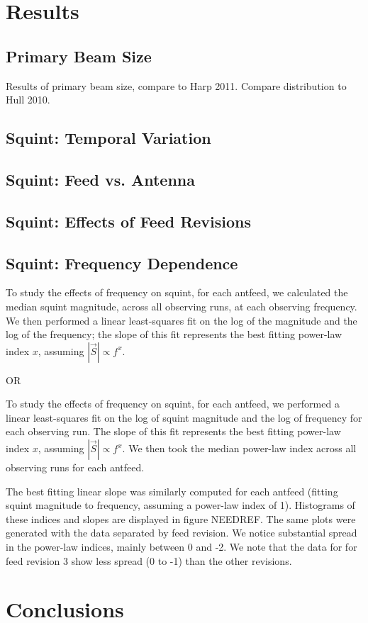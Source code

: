 \documentclass[preprint]{aastex}
\begin{document}
\section{Results}\label{s.results}

\subsection{Primary Beam Size}\label{ss.beamsize}
Results of primary beam size, compare to Harp 2011\cite{Harp2011}.
Compare distribution to Hull 2010\cite{Hull2010}.

\subsection{Squint: Temporal Variation}\label{ss.temporal}

\subsection{Squint: Feed vs. Antenna}\label{ss.antfeed}

\subsection{Squint: Effects of Feed Revisions}\label{ss.revisions}

\subsection{Squint: Frequency Dependence}\label{ss.freq}
To study the effects of frequency on squint, for each antfeed, we calculated the median squint magnitude, across all observing runs, at each observing frequency.  We then performed a linear least-squares fit on the log of the magnitude and the log of the frequency; the slope of this fit represents the best fitting power-law index $x$, assuming $|\vec{S}| \propto f^x$.

OR

To study the effects of frequency on squint, for each antfeed, we performed a linear least-squares fit on the log of squint magnitude and the log of frequency for each observing run.  The slope of this fit represents the best fitting power-law index $x$, assuming $|\vec{S}| \propto f^x$.  We then took the median power-law index across all observing runs for each antfeed.

The best fitting linear slope was similarly computed for each antfeed (fitting squint magnitude to frequency, assuming a power-law index of 1).  Histograms of these indices and slopes are displayed in figure NEEDREF.  The same plots were generated with the data separated by feed revision.  We notice substantial spread in the power-law indices, mainly between 0 and -2.  We note that the data for for feed revision 3 show less spread (0 to -1) than the other revisions.

\section{Conclusions}\label{s.conclusions}



\end{document}
